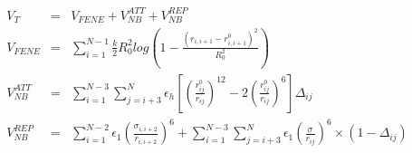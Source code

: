 \documentclass[]{article}
\begin{document}
\LARGE %


$$
\begin{array}{rcl}
  V_{T}        & = & V_{FENE} + V^{ATT}_{NB} + V^{REP}_{NB} \\
  V_{FENE}     & = & \sum_{i=1}^{N-1} \frac{k}{2} R_{0}^{2} log \left( 1 - \frac{\left(r_{i,i+1} - r_{i,i+1}^{0}\right)^2}{R_{0}^{2}} \right) \\
  V^{ATT}_{NB} & = & \sum_{i=1}^{N-3} \sum_{j=i+3}^{N} \epsilon_{h} \left[\left(\frac{r^{0}_{ij}}{r_{ij}}\right)^{12}-2\left(\frac{r^{0}_{ij}}{r_{ij}}\right)^{6}\right]\Delta_{ij} \\
  V^{REP}_{NB} & = & \sum_{i=1}^{N-2} \epsilon_{1} \left(\frac{\sigma_{i,i+2}}{r_{i,i+2}}\right)^{6}+ \sum_{i=1}^{N-3} \sum_{j=i+3}^{N} \epsilon_{1}\left(\frac{\sigma}{r_{ij}}\right)^{6} \times \left(1-\Delta_{ij}\right) \\
\end{array}
$$




\end{document}
